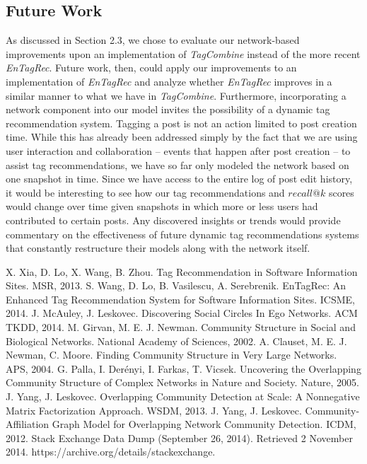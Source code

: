 \documentclass[11pt]{IEEEtran}
\begin{document}
\subsection{Future Work}

As discussed in Section 2.3, we chose to evaluate our network-based improvements upon an implementation of \textit{TagCombine} instead of the more recent \textit{EnTagRec}. Future work, then, could apply our improvements to an implementation of \textit{EnTagRec} and analyze whether \textit{EnTagRec} improves in a similar manner to what we have in \textit{TagCombine}. Furthermore, incorporating a network component into our model invites the possibility of a dynamic tag recommendation system. Tagging a post is not an action limited to post creation time. While this has already been addressed simply by the fact that we are using user interaction and collaboration -- events that happen after post creation -- to assist tag recommendations, we have so far only modeled the network based on one snapshot in time. Since we have access to the entire log of post edit history, it would be interesting to see how our tag recommendations and $recall@k$ scores would change over time given snapshots in which more or less users had contributed to certain posts. Any discovered insights or trends would provide commentary on the effectiveness of future dynamic tag recommendations systems that constantly restructure their models along with the network itself.


\begin{thebibliography}{1}
 X. Xia, D. Lo, X. Wang, B. Zhou. Tag Recommendation in Software Information Sites. MSR, 2013.
 S. Wang, D. Lo, B. Vasilescu, A. Serebrenik. EnTagRec: An Enhanced Tag Recommendation System for Software Information Sites. ICSME, 2014.
 J. McAuley, J. Leskovec. Discovering Social Circles In Ego Networks. ACM TKDD, 2014.
 M. Girvan, M. E. J. Newman. Community Structure in Social and Biological Networks. National Academy of Sciences, 2002.
 A. Clauset, M. E. J. Newman, C. Moore. Finding Community Structure in Very Large Networks. APS, 2004.
 G. Palla, I. Der\'{e}nyi, I. Farkas, T. Vicsek. Uncovering the Overlapping Community Structure of Complex Networks in Nature and Society. Nature, 2005.
 J. Yang, J. Leskovec. Overlapping Community Detection at Scale: A Nonnegative Matrix Factorization Approach. WSDM, 2013.
 J. Yang, J. Leskovec. Community-Affiliation Graph Model for Overlapping Network Community Detection. ICDM, 2012.
 Stack Exchange Data Dump (September 26, 2014). Retrieved 2 November 2014. https://archive.org/details/stackexchange.

\end{thebibliography}
\end{document}
